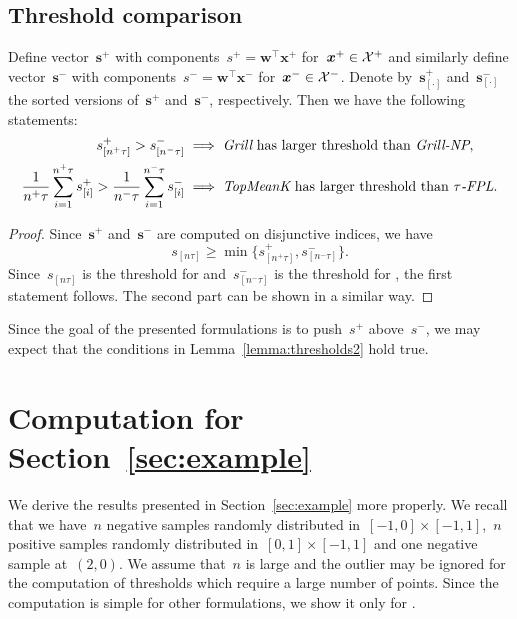\subsection{Threshold comparison}\label{app:relations}

\begin{lemma}\label{lemma:thresholds2}
  Define vector~$\bm{s}^+$ with components~$s^+=\bm{w}^\top \bm{x}^+$ for~$\bm{x}^+\in\mathcal{X}^+$ and similarly define vector~$\bm{s}^-$ with components~$s^-=\bm{w}^\top \bm{x}^-$ for~$\bm{x}^-\in\mathcal{X}^-$. Denote by~$\bm{s}_{[\cdot]}^+$ and~$\bm{s}_{[\cdot]}^-$ the sorted versions of~$\bm{s}^+$ and~$\bm{s}^-$, respectively. Then we have the following statements:
  \begin{equation*}
    \begin{aligned}
      s_{[n^+\tau]}^+ > s_{[n^-\tau]}^-
      & \implies \emph{Grill} \text{ has larger threshold than }\emph{Grill-NP}, \\
      \frac{1}{n^+\tau}\sum_{i=1}^{n^+\tau} s_{[i]}^+
      > \frac{1}{n^-\tau}\sum_{i=1}^{n^-\tau} s_{[i]}^-
      & \implies \emph{TopMeanK} \text{ has larger threshold than }{\emph{$\tau$-FPL}}. \\
    \end{aligned}
  \end{equation*}
\end{lemma}

\begin{proof}
  Since~$\bm{s}^+$ and~$\bm{s}^-$ are computed on disjunctive indices, we have
  \begin{equation*}
    s_{[n\tau]} \ge \min\{s_{[n^+\tau]}^+, s_{[n^-\tau]}^-\}.
  \end{equation*}
  Since~$s_{[n\tau]}$ is the threshold for \Grill and~$s_{[n^-\tau]}^-$ is the threshold for \GrillNP, the first statement follows. The second part can be shown in a similar way.
\end{proof}
  
\noindent Since the goal of the presented formulations is to push~$s^+$ above~$s^-$, we may expect that the conditions in Lemma~\ref{lemma:thresholds2} hold true. 
  
\section{Computation for Section~\ref{sec:example}}\label{app:example}

We derive the results presented in Section~\ref{sec:example} more properly. We recall that we have~$n$ negative samples randomly distributed in~$[-1,0]\times[-1,1]$,~$n$ positive samples randomly distributed in~$[0,1]\times[-1,1]$ and one negative sample at~$(2,0)$. We assume that~$n$ is large and the outlier may be ignored for the computation of thresholds which require a large number of points. Since the computation is simple for other formulations, we show it only for \PatMat.
  
